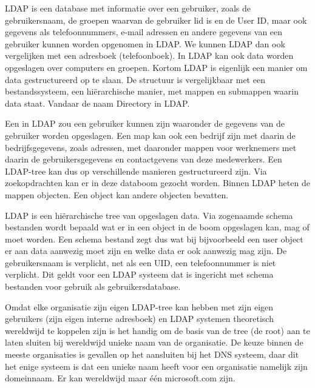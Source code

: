 LDAP is een database met informatie over een gebruiker, zoals de gebruikersnaam, de groepen waarvan de gebruiker lid is en de User ID, maar ook gegevens als telefoonnummers, e-mail adressen en andere gegevens van een gebruiker kunnen worden opgenomen in LDAP. We kunnen LDAP dan ook vergelijken met een adresboek (telefoonboek). In LDAP kan ook data worden opgeslagen over computers en groepen. Kortom LDAP is eigenlijk een manier om data gestructureerd op te slaan. De structuur is vergelijkbaar met een bestandssysteem, een hi\"erarchische manier, met mappen en submappen waarin data staat. Vandaar de naam Directory in LDAP.

Een  in LDAP zou een gebruiker kunnen zijn waaronder de gegevens van de gebruiker worden opgeslagen. Een map kan ook een bedrijf zijn met daarin de bedrijfsgegevens, zoals adressen, met daaronder mappen voor werknemers met daarin de gebruikersgegevens en contactgevens van deze medewerkers. Een LDAP-tree kan dus op verschillende manieren gestructureerd zijn. Via zoekopdrachten kan er in deze databoom gezocht worden. Binnen LDAP heten de mappen objecten. Een object kan andere objecten bevatten.

LDAP is een hi\"erarchische tree van opgeslagen data. Via zogenaamde schema bestanden wordt bepaald wat er in een object in de boom opgeslagen kan, mag of moet worden. Een schema bestand zegt dus wat bij bijvoorbeeld een user object er aan data aanwezig moet zijn en welke data er ook aanwezig mag zijn. De gebruikersnaam is verplicht, net als een UID, een telefoonnummer is niet verplicht. Dit geldt voor een LDAP systeem dat is ingericht met schema bestanden voor gebruik als gebruikersdatabase.

Omdat elke organisatie zijn eigen LDAP-tree kan hebben met zijn eigen gebruikers (zijn eigen interne adresboek) en LDAP systemen theoretisch wereldwijd te koppelen zijn is het handig om de basis van de tree (de root) aan te laten sluiten bij wereldwijd unieke naam van de organisatie. De keuze binnen de meeste organisaties is gevallen op het aansluiten bij het DNS systeem, daar dit het enige systeem is dat een unieke naam heeft voor een organisatie namelijk zijn domeinnaam. Er kan wereldwijd maar \'e\'en microsoft.com zijn.

